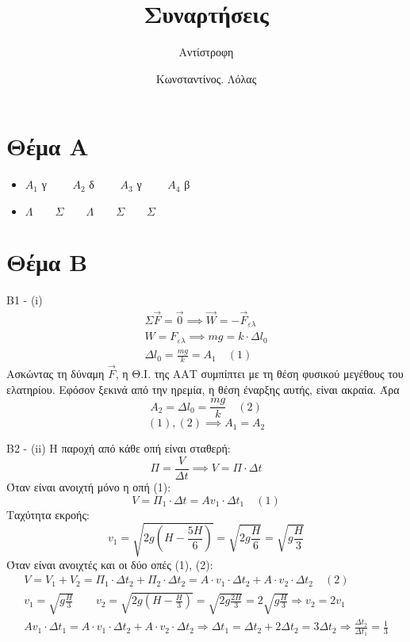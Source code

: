 \documentclass[greek]{beamer}
\title{Συναρτήσεις}
\subtitle{Αντίστροφη}
\author[Λόλας]{Κωνσταντίνος. Λόλας}
\date{}
\begin{document}
\begin{frame}
 \titlepage
\end{frame}

\section{Θέμα Α}
\begin{frame}
 \begin{itemize}
  \item $Α_1$ γ $\qquad Α_2$ δ $\qquad Α_3$ γ $\qquad Α_4$ β
  \item $Λ \qquad Σ \qquad Λ \qquad Σ \qquad Σ$
 \end{itemize}
\end{frame}

\section{Θέμα Β}
\begin{frame}{Β1 - (i)}
 \begin{gather*}
  Σ\overrightarrow{F}=\overrightarrow{0}\implies \overrightarrow{W}=-\overrightarrow{F}_{ελ} \\
  W=F_{ελ}\implies mg=k\cdot Δl_0  \\
  Δl_0=\frac{mg}{k}=Α_1 \quad (1)
 \end{gather*}
 Ασκώντας τη δύναμη $\overrightarrow{F}$, η Θ.Ι. της ΑΑΤ συμπίπτει με τη θέση φυσικού μεγέθους του ελατηρίου. Εφόσον ξεκινά από την ηρεμία, η θέση έναρξης αυτής, είναι ακραία. Άρα $$Α_2=Δl_0=\frac{mg}{k} \quad (2)$$
 $$(1),(2)\implies Α_1=Α_2$$
\end{frame}

\begin{frame}{Β2 - (ii)}
 \begingroup
 \tiny%
 Η παροχή από κάθε οπή είναι σταθερή: $$Π=\frac{V}{Δt}\implies V=Π\cdot Δt$$
 Όταν είναι ανοιχτή μόνο η οπή (1): $$V=Π_1\cdot Δt=Αv_1\cdot Δt_1 \quad (1)$$
 Ταχύτητα εκροής: $$v_1=\sqrt{2g\left(H-\frac{5H}{6}\right)}=\sqrt{2g\frac{H}{6}}=\sqrt{g\frac{H}{3}}$$
 Όταν είναι ανοιχτές και οι δύο οπές (1), (2):
 \begin{gather*}
  V=V_1+V_2=Π_1\cdot Δt_2+Π_2\cdot Δt_2=Α\cdot v_1\cdot Δt_2+Α\cdot v_2\cdot Δt_2 \quad (2) \\
  v_1=\sqrt{g\frac{H}{3}} \qquad v_2=\sqrt{2g\left(H-\frac{H}{3}\right)}=\sqrt{2g\frac{2H}{3}}=2\sqrt{g\frac{H}{3}} \Rightarrow v_2=2v_1 \\
  Αv_1\cdot Δt_1 = Α\cdot v_1\cdot Δt_2+Α\cdot v_2\cdot Δt_2 \Rightarrow Δt_1=Δt_2+2Δt_2=3Δt_2\Rightarrow \frac{Δt_2}{Δt_1}=\frac{1}{3}
 \end{gather*}
 \endgroup
\end{frame}
\end{document}
